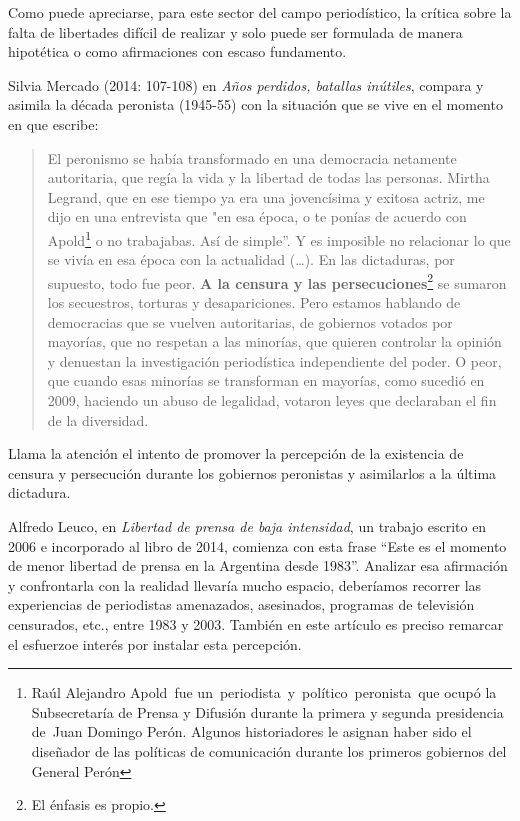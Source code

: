 Como puede apreciarse, para este sector del campo periodístico, la crítica sobre la falta de libertades difícil de realizar y solo puede ser formulada de manera hipotética o como afirmaciones con escaso fundamento.

Silvia Mercado (2014: 107-108) en \emph{Años perdidos, batallas inútiles}, compara y asimila la década peronista (1945-55) con la situación que se vive en el momento en que escribe:

\begin{quote}
El peronismo se había transformado en una democracia netamente autoritaria, que regía la vida y la libertad de todas las personas. Mirtha Legrand, que en ese tiempo ya era una jovencísima y exitosa actriz, me dijo en una entrevista que "en esa época, o te ponías de acuerdo con Apold\footnote{Raúl Alejandro Apold~fue un~periodista~y~político~peronista~que ocupó la Subsecretaría de Prensa y Difusión durante la primera y segunda presidencia de~Juan Domingo Perón. Algunos historiadores le asignan haber sido el diseñador de las políticas de comunicación durante los primeros gobiernos del General Perón} o no trabajabas. Así de simple''. Y es imposible no relacionar lo que se vivía en esa época con la actualidad (\ldots). En las dictaduras, por supuesto, todo fue peor. \textbf{A la censura y las persecuciones}\footnote{El énfasis es propio.} se sumaron los secuestros, torturas y desapariciones. Pero estamos hablando de democracias que se vuelven autoritarias, de gobiernos votados por mayorías, que no respetan a las minorías, que quieren controlar la opinión y denuestan la investigación periodística independiente del poder. O peor, que cuando esas minorías se transforman en mayorías, como sucedió en 2009, haciendo un abuso de legalidad, votaron leyes que declaraban el fin de la diversidad.
\end{quote}

Llama la atención el intento de promover la percepción de la existencia de censura y persecución durante los gobiernos peronistas y asimilarlos a la última dictadura.

Alfredo Leuco, en \emph{Libertad de prensa de baja intensidad}, un trabajo escrito en 2006 e incorporado al libro de 2014, comienza con esta frase ``Este es el momento de menor libertad de prensa en la Argentina desde 1983''. Analizar esa afirmación y confrontarla con la realidad llevaría mucho espacio, deberíamos recorrer las experiencias de periodistas amenazados, asesinados, programas de televisión censurados, etc., entre 1983 y 2003. También en este artículo es preciso remarcar el esfuerzoe interés por instalar esta percepción.

